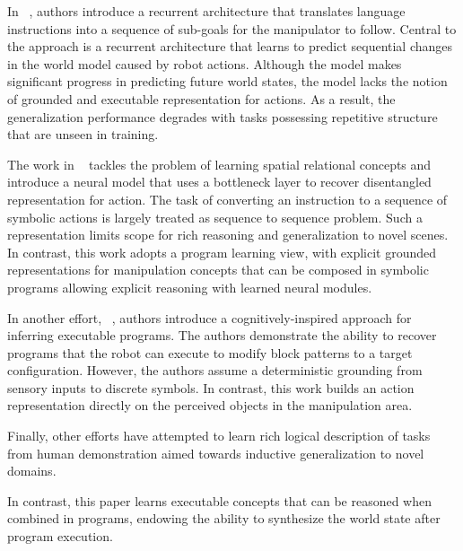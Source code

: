 In ~\cite{paxton2019prospection}, authors introduce a recurrent architecture that 
translates language instructions into a sequence of sub-goals for the manipulator to follow. 
Central to the approach is a recurrent architecture that learns to predict sequential changes in the world 
model caused by robot actions. Although the model makes significant progress in predicting future world states, 
the model lacks the notion of grounded and executable representation for actions. As a result, 
the generalization performance degrades with tasks possessing repetitive structure that are unseen in training. 

The work in  ~\cite{paxton2019prospection} tackles the problem of learning spatial relational concepts 
and introduce a neural model that uses a bottleneck layer to recover disentangled representation for action. 
The task of converting an instruction to a sequence of symbolic actions is largely treated as sequence to 
sequence problem. Such a representation limits scope for rich reasoning and generalization to novel scenes.  
%
In contrast, this work adopts a program learning view, with explicit grounded representations for manipulation 
concepts that can be composed in symbolic programs allowing explicit reasoning with learned neural modules. 

In another effort, ~\cite{lazaro2019beyond}, authors introduce a cognitively-inspired approach for inferring 
executable programs. The authors demonstrate the ability to recover programs that the robot can execute to
modify block patterns to a target configuration. However, the authors assume a deterministic grounding from 
sensory inputs to discrete symbols. In contrast, this work builds an action representation directly on the 
perceived objects in the manipulation area. 


Finally, other efforts have attempted to learn rich logical description of tasks from human demonstration 
aimed towards inductive generalization to novel domains. 
%
 
In contrast, this paper learns executable concepts that can be reasoned when combined in programs, 
endowing the ability to synthesize the world state after program execution.  
%

